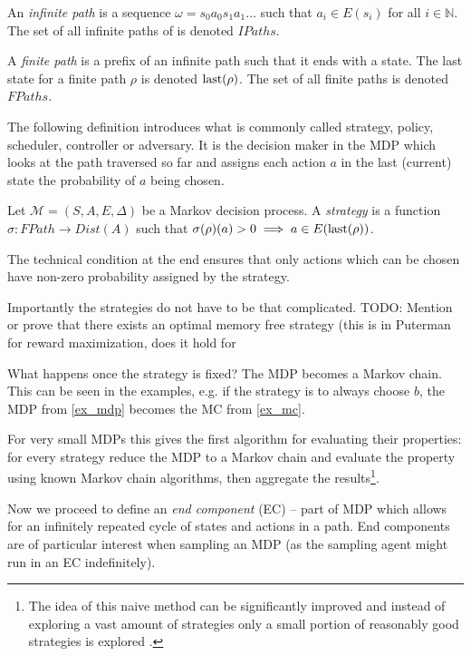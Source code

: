\begin{definition}[Path]
    An {\em infinite path} is
    a sequence $\omega = s_0 a_0 s_1 a_1
    \ldots$ such that $a_i \in E(s_i)$ for all $i \in \mathbb{N}$.
    The set of all infinite paths of is denoted $IPaths$.

    A {\em finite path} is a prefix of an infinite path such that it
    ends with a state. The last state for a finite path $\rho$ is
    denoted $\operatorname{last}(\rho)$. The set of all finite paths is denoted
    $FPaths$.
\end{definition}

The following definition introduces what is commonly called strategy,
policy, scheduler, controller or adversary. It is the decision maker in
the MDP which looks at the path traversed so far and assigns each action
$a$ in the last (current) state the probability of $a$ being chosen.

\begin{definition}[Strategy]
    Let $\mathcal{M} = (S,A,E,\Delta)$ be a Markov decision process.
    A {\em strategy} is a function
    $\sigma : FPath \to Dist(A)$
    such that
    $\sigma(\rho)(a) > 0 \implies a \in E(\operatorname{last}(\rho))$.
\end{definition}

The technical condition at the end ensures that only actions which can
be chosen have non-zero probability assigned by the strategy.

Importantly the strategies do not have to be that complicated.
TODO: Mention or prove that there exists an optimal memory free strategy
(this is in Puterman for reward maximization, does it hold for

What happens once the strategy is fixed? The MDP becomes a Markov chain.
This can be seen in the examples, e.g. if the strategy is to always
choose $b$, the MDP from \autoref{ex_mdp} becomes the MC from
\autoref{ex_mc}.

For very small MDPs this gives the first algorithm for evaluating their
properties: for every strategy reduce the MDP to a Markov chain and evaluate the
property using known Markov chain algorithms, then aggregate the
results\footnote{The idea of this naive method can be significantly improved and instead
of exploring a vast amount of strategies only a small portion of
reasonably good strategies is explored \parencite{smc}.}.


Now we proceed to define an {\em end component} (EC) -- part of MDP which
allows for an infinitely repeated cycle of states and actions in a path.
End components are of particular interest when sampling an MDP (as the sampling
agent might run in an EC indefinitely).

